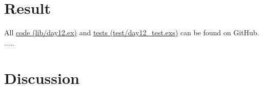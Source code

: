 \documentclass[a4paper,11pt]{article}
\begin{document}
\section*{Result}
\label{sec:result}
All
\href{https://github.com/VincentFerrigan/kth-id1019-programming-ii/tree/main/tasks/5/day12/lib/day12.ex}{code (lib/day12.ex)} and %
\href{https://github.com/VincentFerrigan/kth-id1019-programming-ii/tree/main/tasks/5/day12/test/day12_test.exs}{tests (test/day12\_test.exs)}
can be found on GitHub.
.....


\section*{Discussion}
\label{sec:discussion}
\end{document}

